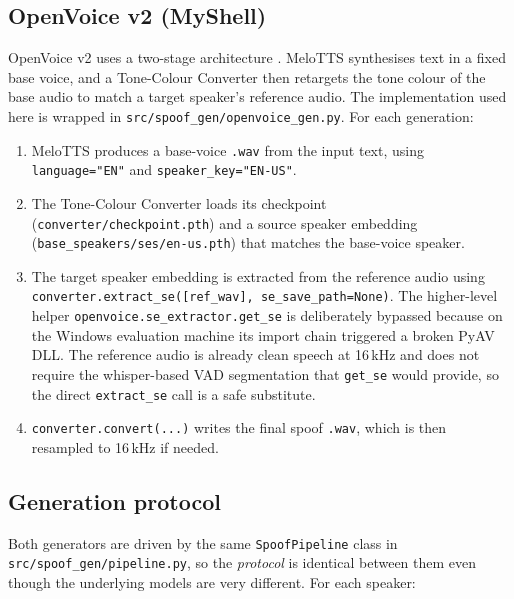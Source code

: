 \subsection{OpenVoice v2 (MyShell)}
\label{sec:methodology-generators-openvoice}

OpenVoice v2 uses a two-stage architecture \cite{Qin2023_OpenVoice}.
MeloTTS synthesises text in a fixed base voice, and a Tone-Colour
Converter then retargets the tone colour of the base audio to match
a target speaker's reference audio. The implementation used here is
wrapped in \texttt{src/spoof\_gen/openvoice\_gen.py}. For each
generation:

\begin{enumerate}
    \item MeloTTS produces a base-voice \texttt{.wav} from the input text, using
        \texttt{language="EN"} and \texttt{speaker\_key="EN-US"}.
    \item The Tone-Colour Converter loads its checkpoint (\texttt{converter/}\allowbreak\texttt{checkpoint.pth})
        and a source speaker embedding
        (\texttt{base\_speakers/}\allowbreak\texttt{ses/}\allowbreak\texttt{en-us.pth}) that matches the base-voice
        speaker.
    \item The target speaker embedding is extracted from the reference
        audio using \texttt{converter.extract\_se([ref\_wav], se\_save\_path=None)}.
        The higher-level helper \texttt{openvoice.se\_extractor.get\_se} is
        deliberately bypassed because on the Windows evaluation machine
        its import chain triggered a broken PyAV DLL. The reference audio
        is already clean speech at 16\,kHz and does not require the
        whisper-based VAD segmentation that \texttt{get\_se} would provide, so
        the direct \texttt{extract\_se} call is a safe substitute.
    \item \texttt{converter.convert(...)} writes the final spoof \texttt{.wav}, which is
        then resampled to 16\,kHz if needed.
\end{enumerate}

\subsection{Generation protocol}
\label{sec:methodology-generators-protocol}

Both generators are driven by the same \texttt{SpoofPipeline} class
in \texttt{src/spoof\_gen/pipeline.py}, so the \emph{protocol} is
identical between them even though the underlying models are very
different. For each speaker:

